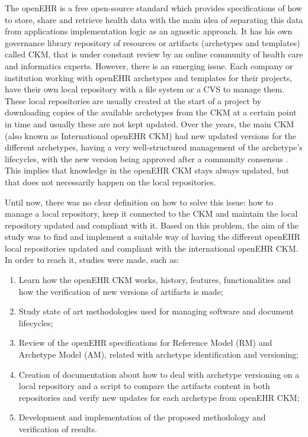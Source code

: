 \documentclass[mim_thesis.tex]{subfiles}
\begin{document}
The openEHR is a free open-source standard which provides specifications 
of how to store, share and retrieve health data with the main idea of separating this 
data from applications implementation logic as an agnostic approach. It has his own governance library repository of resources or artifacts (archetypes and templates) called \ac{CKM}, that is under constant review by an online community of health care and informatics experts. However, there is an emerging issue. Each company or institution working with openEHR archetypes and templates for their projects, have their own local repository with a file system or a \ac{CVS} to manage them. These local repositories are usually created at the start of a project by downloading copies of the available archetypes from the CKM at a certain point in time and usually these are not kept updated. Over the years, the main CKM (also known as International openEHR CKM) had new updated versions for the different archetypes, having a very well-structured management of the archetype’s lifecycles, with the new version being approved after a community consensus \citep{Leslie2017}. This implies that knowledge in the openEHR CKM stays always updated, but that 
does not necessarily happen on the local repositories. 

Until now, there was no clear definition on how to solve this issue: how to 
manage a local repository, keep it connected to the CKM and maintain the local 
repository updated and compliant with it. Based on this problem, the aim of the study was to find and implement a suitable way of having the different openEHR local repositories updated and compliant with the international openEHR CKM. In order to reach it, studies were made, such as: 
\begin{enumerate} [noitemsep]
\item Learn how the openEHR CKM works, history, features, functionalities and 
how the verification of new versions of artifacts is made;  
\item Study state of art methodologies used for managing software and document 
lifecycles;  
\item Review of the openEHR specifications for Reference Model (RM) and 
Archetype Model (AM), related with archetype identification and versioning; 
\item Creation of documentation about how to deal with archetype versioning on a 
local repository and a script to compare the artifacts content in both 
repositories and verify new updates for each archetype from openEHR CKM; 
\item Development and implementation of the proposed methodology and 
verification of results.
\end{enumerate}
\end{document}
